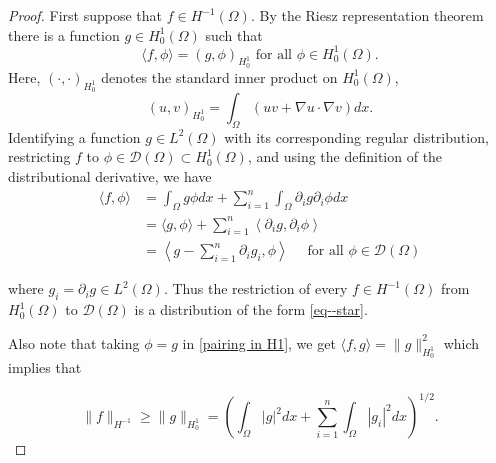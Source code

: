 \documentclass[11pt]{article}
\begin{document}
			\begin{proof}
			    First suppose that \(f \in H^{-1}(\Omega) .\) By the Riesz representation theorem
                there is a function \(g \in H_{0}^{1}(\Omega)\) such that
                \begin{equation}
                    \label{pairing in H1}
                    \langle f, \phi\rangle=(g, \phi)_{H_{0}^{1}} \text { for all } \phi \in H_{0}^{1}(\Omega) .
                \end{equation}
                Here, \((\cdot, \cdot)_{H_{0}^{1}}\) denotes the standard inner product on \(H_{0}^{1}(\Omega)\),
                $$
                (u, v)_{H_{0}^{1}}=\int_{\Omega}(u v+\nabla u \cdot \nabla v) d x .
                $$
                Identifying a function \(g \in L^{2}(\Omega)\) with its corresponding regular distribution, restricting \(f\) to \(\phi \in \mathcal{D}(\Omega) \subset H_{0}^{1}(\Omega)\), and using the definition of the distributional derivative, we have
                \begin{align*}\langle f, \phi\rangle &=\int_{\Omega} g \phi d x+\sum_{i=1}^{n} \int_{\Omega} \partial_{i} g \partial_{i} \phi d x \\ &=\langle g, \phi\rangle+\sum_{i=1}^{n}\left\langle\partial_{i} g, \partial_{i} \phi\right\rangle \\ &=\left\langle g-\sum_{i=1}^{n} \partial_{i} g_{i}, \phi\right\rangle \quad \text { for all } \phi \in \mathcal{D}(\Omega) \end{align*}
                
                where $g_{i}=\partial_{i} g \in L^{2}(\Omega).$ Thus the restriction of every \(f \in H^{-1}(\Omega)\) from \(H_{0}^{1}(\Omega)\) to
                \(\mathcal{D}(\Omega)\) is a distribution of the form \eqref{eq--star}.
                
                 Also note that taking  $ \phi=g$ in \eqref{pairing in H1}, we get $\langle f, g\rangle=\|g\|_{H_{0}^{1}}^{2}$ which implies that 
                 
                $$\|f\|_{H^{-1}} \geq\|g\|_{H_{0}^{1}}=\left(\int_{\Omega} |g|^{2} d x+\sum_{i=1}^{n} \int_{\Omega} |g_{i}|^{2} d x\right)^{1 / 2}.$$
                

\end{proof}
\end{document}
